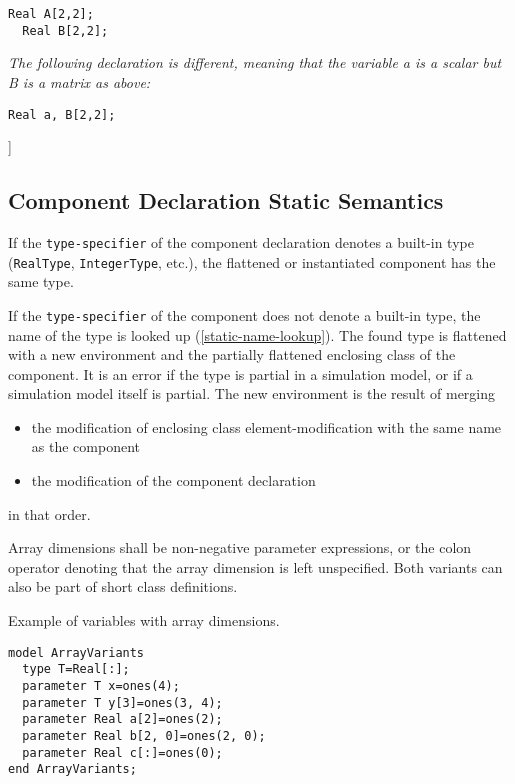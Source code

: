 \begin{lstlisting}[language=modelica]
  Real A[2,2];
  Real B[2,2];
\end{lstlisting}
\emph{The following declaration is different, meaning that the variable
a is a scalar but B is a matrix as above:}

\begin{lstlisting}[language=modelica]
  Real a, B[2,2];
\end{lstlisting}
{]}

\subsection{Component Declaration Static Semantics}

If the \lstinline!type-specifier! of the component declaration denotes a built-in
type (\lstinline!RealType!, \lstinline!IntegerType!, etc.), the flattened or instantiated
component has the same type.

If the \lstinline!type-specifier! of the component does not denote a built-in type,
the name of the type is looked up (\autoref{static-name-lookup}). The found type is
flattened with a new environment and the partially flattened enclosing
class of the component. It is an error if the type is partial in a
simulation model, or if a simulation model itself is partial. The new
environment is the result of merging

\begin{itemize}
\item
  the modification of enclosing class element-modification with the same
  name as the component
\item
  the modification of the component declaration
\end{itemize}
in that order.

Array dimensions shall be non-negative parameter expressions, or the
colon operator denoting that the array dimension is left unspecified.
Both variants can also be part of short class definitions.

\begin{nonnormative}
Example of variables with array dimensions.
\begin{lstlisting}[language=modelica]
model ArrayVariants
  type T=Real[:];
  parameter T x=ones(4);
  parameter T y[3]=ones(3, 4);
  parameter Real a[2]=ones(2);
  parameter Real b[2, 0]=ones(2, 0);
  parameter Real c[:]=ones(0);
end ArrayVariants;
\end{lstlisting}
\end{nonnormative}


